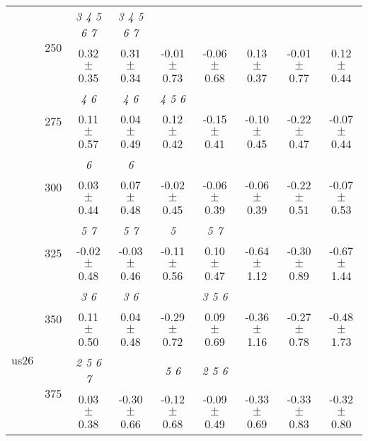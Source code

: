 \begin{table}[h]
{\begin{tabular}{
        ccccccccc}
 & \multirow{2}{*}{250}& \textit{ 3 4 5 6 7 }& \textit{ 3 4 5 6 7 }& & & & &  \\ 
 & & 0.32 $\pm$ 0.35& 0.31 $\pm$ 0.34& -0.01 $\pm$ 0.73& -0.06 $\pm$ 0.68& 0.13 $\pm$ 0.37& -0.01 $\pm$ 0.77& 0.12 $\pm$ 0.44 \\ 
 & \multirow{2}{*}{275}& \cellcolor[HTML]{EFEFEF} \textit{ 4 6 }& \cellcolor[HTML]{EFEFEF} \textit{ 4 6 }& \cellcolor[HTML]{EFEFEF} \textit{ 4 5 6 }& \cellcolor[HTML]{EFEFEF} & \cellcolor[HTML]{EFEFEF} & \cellcolor[HTML]{EFEFEF} & \cellcolor[HTML]{EFEFEF}  \\ 
 & & \cellcolor[HTML]{EFEFEF} 0.11 $\pm$ 0.57& \cellcolor[HTML]{EFEFEF} 0.04 $\pm$ 0.49& \cellcolor[HTML]{EFEFEF} 0.12 $\pm$ 0.42& \cellcolor[HTML]{EFEFEF} -0.15 $\pm$ 0.41& \cellcolor[HTML]{EFEFEF} -0.10 $\pm$ 0.45& \cellcolor[HTML]{EFEFEF} -0.22 $\pm$ 0.47& \cellcolor[HTML]{EFEFEF} -0.07 $\pm$ 0.44 \\ 
 & \multirow{2}{*}{300}& \textit{ 6 }& \textit{ 6 }& & & & &  \\ 
 & & 0.03 $\pm$ 0.44& 0.07 $\pm$ 0.48& -0.02 $\pm$ 0.45& -0.06 $\pm$ 0.39& -0.06 $\pm$ 0.39& -0.22 $\pm$ 0.51& -0.07 $\pm$ 0.53 \\ 
 & \multirow{2}{*}{325}& \cellcolor[HTML]{EFEFEF} \textit{ 5 7 }& \cellcolor[HTML]{EFEFEF} \textit{ 5 7 }& \cellcolor[HTML]{EFEFEF} \textit{ 5 }& \cellcolor[HTML]{EFEFEF} \textit{ 5 7 }& \cellcolor[HTML]{EFEFEF} & \cellcolor[HTML]{EFEFEF} & \cellcolor[HTML]{EFEFEF}  \\ 
 & & \cellcolor[HTML]{EFEFEF} -0.02 $\pm$ 0.48& \cellcolor[HTML]{EFEFEF} -0.03 $\pm$ 0.46& \cellcolor[HTML]{EFEFEF} -0.11 $\pm$ 0.56& \cellcolor[HTML]{EFEFEF} 0.10 $\pm$ 0.47& \cellcolor[HTML]{EFEFEF} -0.64 $\pm$ 1.12& \cellcolor[HTML]{EFEFEF} -0.30 $\pm$ 0.89& \cellcolor[HTML]{EFEFEF} -0.67 $\pm$ 1.44 \\ 
 \multirow{4}{*}{us26} & \multirow{2}{*}{350}& \textit{ 3 6 }& \textit{ 3 6 }& & \textit{ 3 5 6 }& & &  \\ 
 & & 0.11 $\pm$ 0.50& 0.04 $\pm$ 0.48& -0.29 $\pm$ 0.72& 0.09 $\pm$ 0.69& -0.36 $\pm$ 1.16& -0.27 $\pm$ 0.78& -0.48 $\pm$ 1.73 \\ 
 & \multirow{2}{*}{375}& \cellcolor[HTML]{EFEFEF} \textit{ 2 5 6 7 }& \cellcolor[HTML]{EFEFEF} & \cellcolor[HTML]{EFEFEF} \textit{ 5 6 }& \cellcolor[HTML]{EFEFEF} \textit{ 2 5 6 }& \cellcolor[HTML]{EFEFEF} & \cellcolor[HTML]{EFEFEF} & \cellcolor[HTML]{EFEFEF}  \\ 
 & & \cellcolor[HTML]{EFEFEF} 0.03 $\pm$ 0.38& \cellcolor[HTML]{EFEFEF} -0.30 $\pm$ 0.66& \cellcolor[HTML]{EFEFEF} -0.12 $\pm$ 0.68& \cellcolor[HTML]{EFEFEF} -0.09 $\pm$ 0.49& \cellcolor[HTML]{EFEFEF} -0.33 $\pm$ 0.69& \cellcolor[HTML]{EFEFEF} -0.33 $\pm$ 0.83& \cellcolor[HTML]{EFEFEF} -0.32 $\pm$ 0.80 \\ 

\end{tabular}}
\end{table}
